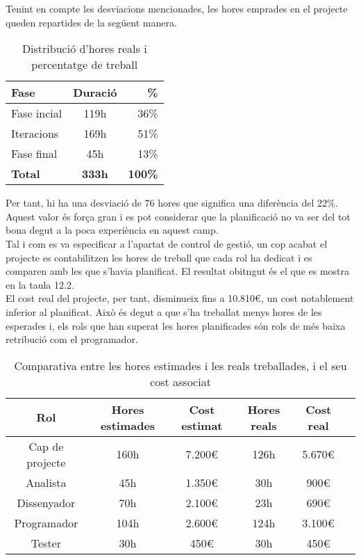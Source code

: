 Tenint en compte les desviacions mencionades, les hores emprades en el projecte queden repartides de la següent manera.

\begin{table}[!h]
\begin{tabular}{|l|c|r|}
\hline
\textbf{Fase}  & \textbf{Duració} & \textbf{\%} \\\hline
Fase incial & 119h & 36\% \\\hline
Iteracions & 169h & 51\% \\\hline
Fase final & 45h & 13\% \\\hline
\textbf{Total} & \textbf{333h}  & \textbf{100\%} \\\hline
\end{tabular}
\label{}
\caption{Distribució d'hores reals i percentatge de treball}
\end{table}

Per tant, hi ha una desviació de 76 hores que significa una diferència del 22\%. Aquest valor és força gran i es pot considerar que la planificació no va ser del
tot bona degut a la poca experiència en aquest camp.\\

Tal i com es va especificar a l’apartat de control de gestió, un cop acabat el projecte es contabilitzen les hores de treball que cada rol ha dedicat i es comparen amb les que s’havia planificat. El resultat obitngut és el que es mostra en la
taula 12.2.\\

El cost real del projecte, per tant, disminueix fins a 10.810\euro, un cost notablement inferior al planificat. Això és degut a que s’ha treballat menys hores de
les esperades i, els rols que han superat les hores planificades són rols de més
baixa retribució com el programador.

\begin{table}[!h]
\begin{tabular}{|c|c|c|c|c|c|}
\hline
\textbf{Rol}  & \textbf{Hores estimades} & \textbf{Cost estimat} & \textbf{Hores reals} & \textbf{Cost real}   \\ \hline
Cap de projecte & 160h & 7.200\euro & 126h & 5.670\euro \\\hline
Analista & 45h & 1.350\euro & 30h & 900\euro \\\hline
Dissenyador & 70h & 2.100\euro & 23h & 690\euro \\\hline
Programador & 104h & 2.600\euro & 124h & 3.100\euro \\\hline
Tester & 30h & 450\euro & 30h & 450\euro \\\hline
\end{tabular} 
\label{}
\caption{Comparativa entre les hores estimades i les reals treballades, i el seu cost associat}
\end{table}

